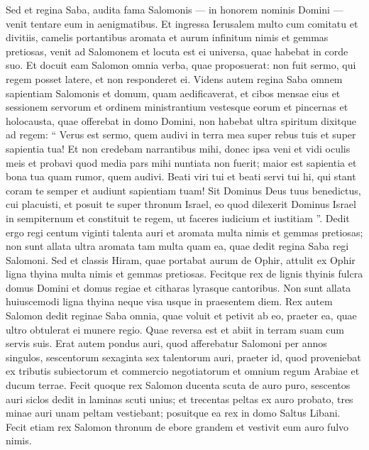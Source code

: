 \begin{biblechapter}
\begin{biblechapter}
\begin{biblechapter}
\begin{biblechapter}
\begin{biblechapter}
\begin{biblechapter}
\begin{biblechapter}
\begin{biblechapter}
\begin{biblechapter}
\begin{biblechapter}
\verse Sed et regina Saba, audita fama Salomonis — in honorem nominis Domini — venit tentare eum in aenigmatibus. 
\verse Et ingressa Ierusalem multo cum comitatu et divitiis, camelis portantibus aromata et aurum infinitum nimis et gemmas pretiosas, venit ad Salomonem et locuta est ei universa, quae habebat in corde suo. 
\verse Et docuit eam Salomon omnia verba, quae proposuerat: non fuit sermo, qui regem posset latere, et non responderet ei. 
\verse Videns autem regina Saba omnem sapientiam Salomonis et domum, quam aedificaverat, 
\verse et cibos mensae eius et sessionem servorum et ordinem ministrantium vestesque eorum et pincernas et holocausta, quae offerebat in domo Domini, non habebat ultra spiritum 
\verse dixitque ad regem: “ Verus est sermo, quem audivi in terra mea super rebus tuis et super sapientia tua! 
\verse Et non credebam narrantibus mihi, donec ipsa veni et vidi oculis meis et probavi quod media pars mihi nuntiata non fuerit; maior est sapientia et bona tua quam rumor, quem audivi. 
\verse Beati viri tui et beati servi tui hi, qui stant coram te semper et audiunt sapientiam tuam! 
\verse Sit Dominus Deus tuus benedictus, cui placuisti, et posuit te super thronum Israel, eo quod dilexerit Dominus Israel in sempiternum et constituit te regem, ut faceres iudicium et iustitiam ”. 
\verse Dedit ergo regi centum viginti talenta auri et aromata multa nimis et gemmas pretiosas; non sunt allata ultra aromata tam multa quam ea, quae dedit regina Saba regi Salomoni.
 \verse Sed et classis Hiram, quae portabat aurum de Ophir, attulit ex Ophir ligna thyina multa nimis et gemmas pretiosas. 
\verse Fecitque rex de lignis thyinis fulcra domus Domini et domus regiae et citharas lyrasque cantoribus. Non sunt allata huiuscemodi ligna thyina neque visa usque in praesentem diem.
 \verse Rex autem Salomon dedit reginae Saba omnia, quae voluit et petivit ab eo, praeter ea, quae ultro obtulerat ei munere regio. Quae reversa est et abiit in terram suam cum servis suis.
 \verse Erat autem pondus auri, quod afferebatur Salomoni per annos singulos, sescentorum sexaginta sex talentorum auri, 
\verse praeter id, quod proveniebat ex tributis subiectorum et commercio negotiatorum et omnium regum Arabiae et ducum terrae.
 \verse Fecit quoque rex Salomon ducenta scuta de auro puro, sescentos auri siclos dedit in laminas scuti unius; 
\verse et trecentas peltas ex auro probato, tres minae auri unam peltam vestiebant; posuitque ea rex in domo Saltus Libani.
 \verse Fecit etiam rex Salomon thronum de ebore grandem et vestivit eum auro fulvo nimis. 

\end{biblechapter}
\end{biblechapter}
\end{biblechapter}
\end{biblechapter}
\end{biblechapter}
\end{biblechapter}
\end{biblechapter}
\end{biblechapter}
\end{biblechapter}
\end{biblechapter}
